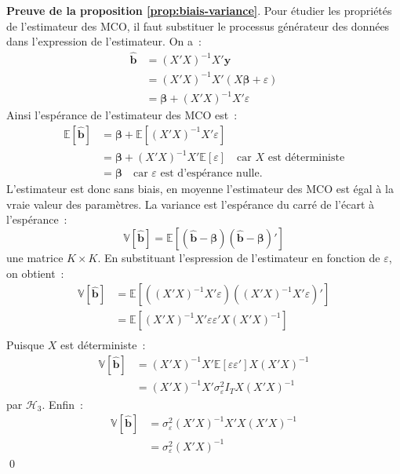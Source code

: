 \documentclass[10pt]{beamer}
\theoremstyle{plain}
\begin{document}
\begin{notes}

  \textbf{Preuve de la proposition \ref{prop:biais-variance}}. Pour étudier les propriétés de l'estimateur des MCO, il faut substituer le processus générateur des données dans l'expression de l'estimateur. On a~:
  \[
    \begin{split}
      \hat{\mathbf b} &= (X'X)^{-1}X'\mathbf y\\
                      &= (X'X)^{-1}X'\left( X\bm \beta + \varepsilon \right)\\
                      &= \bm \beta + (X'X)^{-1}X'\varepsilon
    \end{split}
  \]
  Ainsi l'espérance de l'estimateur des MCO est~:
  \[
    \begin{split}
      \mathbb E \left[ \hat{\mathbf b} \right] &= \bm \beta + \mathbb E\left[ (X'X)^{-1}X'\varepsilon \right]\\
                                               &= \bm \beta + (X'X)^{-1}X'\mathbb E\left[ \varepsilon \right]\quad\text{car $X$ est déterministe}\\
                                               &= \bm \beta\quad\text{car $\varepsilon$  est d'espérance nulle.}
    \end{split}
  \]
  L'estimateur est donc sans biais, en moyenne l'estimateur des MCO est égal à la vraie valeur des paramètres. La variance est l'espérance du carré de l'écart à l'espérance~:
  \[
    \mathbb V\left[ \hat{\mathbf b} \right] = \mathbb E\left[\left( \hat{\mathbf b}- \bm\beta \right)\left( \hat{\mathbf b}- \bm\beta \right)'\right]
  \]
  une matrice $K\times K$. En substituant l'espression de l'estimateur en fonction de $\varepsilon$, on obtient~:
\[
    \begin{split}
      \mathbb V\left[ \hat{\mathbf b} \right] &= \mathbb E\left[ \left( (X'X)^{-1}X'\varepsilon \right)\left( (X'X)^{-1}X'\varepsilon \right)' \right]\\
                                              &= \mathbb E\left[ (X'X)^{-1}X'\varepsilon\varepsilon' X (X'X)^{-1} \right]\\
    \end{split}
  \]
Puisque $X$ est déterministe~:
  \[
    \begin{split}
      \mathbb V\left[ \hat{\mathbf b} \right]
                                              &= (X'X)^{-1}X' \mathbb E\left[ \varepsilon\varepsilon' \right]X(X'X)^{-1}\\
                                              &= (X'X)^{-1}X' \sigma_\varepsilon^2I_T X(X'X)^{-1}
    \end{split}
  \]
  par $\mathcal H_3$. Enfin~:
\[
    \begin{split}
      \mathbb V\left[ \hat{\mathbf b} \right]
                                              &= \sigma_\varepsilon^2(X'X)^{-1}X'X(X'X)^{-1}\\
      &= \sigma_\varepsilon^2(X'X)^{-1}
    \end{split}
  \]
  \qed



\end{notes}
\end{document}
